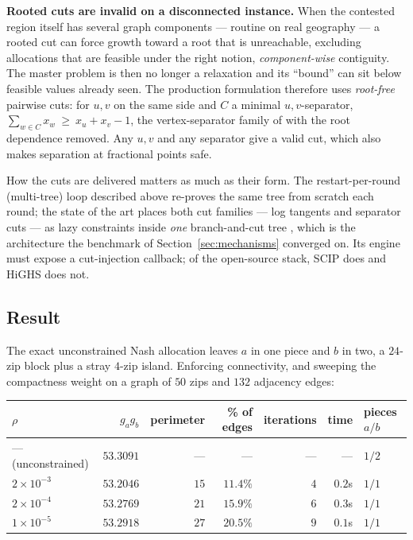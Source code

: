 \documentclass[11pt]{article}
\theoremstyle{remark}\newtheorem*{remark}{Remark}
\begin{document}
\begin{warnbox}
\textbf{Rooted cuts are invalid on a disconnected instance.} When the contested region
itself has several graph components --- routine on real geography --- a rooted cut can
force growth toward a root that is unreachable, excluding allocations that are feasible
under the right notion, \emph{component-wise} contiguity. The master problem is then no
longer a relaxation and its ``bound'' can sit below feasible values already seen. The
production formulation therefore uses \emph{root-free} pairwise cuts: for $u,v$ on the
same side and $C$ a minimal $u,v$-separator,
$\sum_{w\in C}x_w\ \ge\ x_u+x_v-1$, the vertex-separator family of
\citet{validi2021,validibuchanan2022} with the root dependence removed. Any $u,v$ and
any separator give a valid cut, which also makes separation at fractional points safe.
\end{warnbox}

How the cuts are delivered matters as much as their form. The restart-per-round
(multi-tree) loop described above re-proves the same tree from scratch each round; the
state of the art places both cut families --- log tangents and separator cuts --- as
lazy constraints inside \emph{one} branch-and-cut tree
\citep{quesada1992,bonami2008,validi2021}, which is the architecture the benchmark of
Section~\ref{sec:mechanisms} converged on. Its engine must expose a cut-injection
callback; of the open-source stack, SCIP does and HiGHS does not.

\subsection{Result}
The exact unconstrained Nash allocation leaves $a$ in one piece and $b$ in two, a
$24$-zip block plus a stray $4$-zip island. Enforcing connectivity, and sweeping the
compactness weight on a graph of $50$ zips and $132$ adjacency edges:

\begin{center}\begin{tabular}{lrrrrrl}\toprule
$\rho$ & $g_ag_b$ & perimeter & \% of edges & iterations & time & pieces $a/b$\\ \midrule
--- (unconstrained) & $53.3091$ & --- & --- & --- & --- & $1/2$\\
$2\times10^{-3}$ & $53.2046$ & $15$ & $11.4\%$ & $4$ & $0.2$s & $1/1$\\
$2\times10^{-4}$ & $53.2769$ & $21$ & $15.9\%$ & $6$ & $0.3$s & $1/1$\\
$1\times10^{-5}$ & $53.2918$ & $27$ & $20.5\%$ & $9$ & $0.1$s & $1/1$\\
\bottomrule\end{tabular}\end{center}
\end{document}
